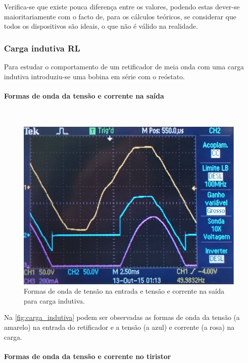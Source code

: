 \documentclass[a4paper,11pt]{article}
\numberwithin{equation}{section}
\begin{document}
Verifica-se que existe pouca diferença entre os valores, podendo estas dever-se maioritariamente com o facto de, para os cálculos teóricos, se considerar que todos os dispositivos são ideais, o que não é válido na realidade.

\subsubsection{Carga indutiva RL}

Para estudar o comportamento de um retificador de meia onda com uma carga indutiva introduziu-se uma bobina em série com o reóstato.

\paragraph{Formas de onda da tensão e corrente na saída}\mbox{}\

\begin{figure}[h]
	\centering
	\includegraphics[keepaspectratio=true, scale=0.13]{img/figs/carga_indutiva}
	\caption{Formas de onda de tensão na entrada e tensão e corrente na saída para carga indutiva.}
	\label{fig:carga_indutiva}
	\vspace{-0.8em}
\end{figure}

Na \autoref{fig:carga_indutiva} podem ser observadas as formas de onda da tensão (a amarelo) na entrada do retificador e a tensão (a azul) e corrente (a rosa) na carga.

\paragraph{Formas de onda da tensão e corrente no tiristor}\mbox{}\
\end{document}
